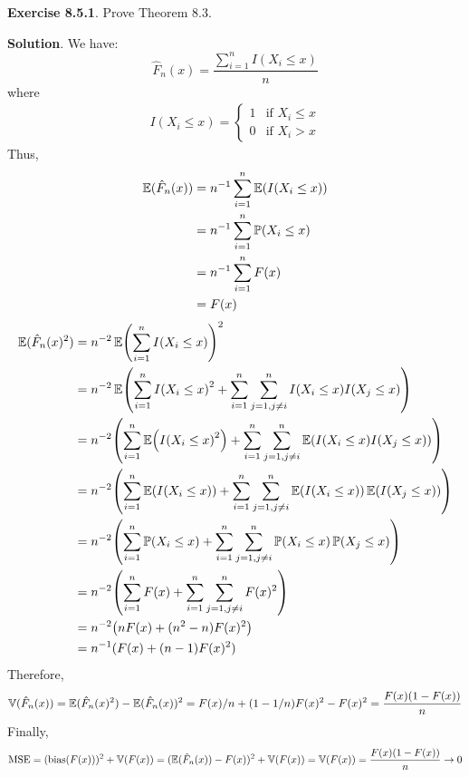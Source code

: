 \textbf{Exercise 8.5.1}. Prove Theorem 8.3.

\textbf{Solution}. We have:
\[
\hat{F}_{n}(x) = \frac{\sum_{i=1}^{n} I\left(X_{i} \leq x \right)}{n}
\]
where
\begin{align*}I\left(X_{i} \leq x\right) =
    \begin{cases}
      1   & \text{if } X_{i} \leq x \\
      0   & \text{if } X_{i} > x
    \end{cases}       
\end{align*}
Thus,
\begin{align*}
\EXP(\hat{F}_{n}(x)) & = n^{-1} \sum_{i = 1}^{n} \EXP(I\left(X_{i} \leq x \right)) \\
 & = n^{-1} \sum_{i = 1}^{n} \PROB\left(X_{i} \leq x \right) \\
 & = n^{-1} \sum_{i = 1}^{n} F(x) \\
 & = F(x)
\end{align*}
\begin{align*}
\EXP(\hat{F}_{n}(x)^{2}) & = n^{-2} \EXP \left( \sum_{i = 1}^{n} I\left(X_{i} \leq x \right) \right)^{2} \\
& = n^{-2} \EXP \left( \sum_{i = 1}^{n} I\left(X_{i} \leq x \right)^{2} 
+ \sum_{i = 1}^{n} \sum_{j = 1, j \neq i}^{n} I\left(X_{i} \leq x \right) I\left(X_{j} \leq x \right) \right) \\
& = n^{-2} \left( \sum_{i = 1}^{n} \EXP \left( I\left(X_{i} \leq x \right)^{2} \right)
+ \sum_{i = 1}^{n} \sum_{j = 1, j \neq i}^{n} \EXP \left( I\left(X_{i} \leq x \right) I\left(X_{j} \leq x \right) \right) \right) \\
& = n^{-2} \left( \sum_{i = 1}^{n} \EXP \left( I\left(X_{i} \leq x \right) \right)
+ \sum_{i = 1}^{n} \sum_{j = 1, j \neq i}^{n} \EXP \left( I\left(X_{i} \leq x \right) \right) \EXP \left( I\left(X_{j} \leq x \right) \right) \right) \\
& = n^{-2} \left( \sum_{i = 1}^{n} \PROB\left(X_{i} \leq x \right) 
+ \sum_{i = 1}^{n} \sum_{j = 1, j \neq i}^{n} \PROB\left(X_{i} \leq x \right) \PROB\left(X_{j} \leq x \right)  \right) \\
&= n^{-2} \left( \sum_{i = 1}^{n} F(x)
+ \sum_{i = 1}^{n} \sum_{j = 1, j \neq i}^{n} F(x)^{2}  \right) \\
&= n^{-2} \left( nF(x) + (n^{2} - n)F(x)^{2} \right) \\
&= n^{-1} ( F(x) + (n - 1) F(x)^{2} )
\end{align*}
Therefore,
\[
\operatorname{\mathbb{V}}(\hat{F}_{n}(x)) 
= \operatorname{\mathbb{E}}(\hat{F}_{n}(x)^{2}) - \operatorname{\mathbb{E}}(\hat{F}_{n}(x))^{2}
= F(x) /n + (1 - 1/n)F(x)^{2} - F(x)^{2}
= \frac{F(x)(1 - F(x))}{n}
\]
Finally,
\[
\operatorname{\mathrm{MSE}} = (\text{bias}(F(x)))^{2} + \operatorname{\mathbb{V}}(F(x)) = (\operatorname{\mathbb{E}}(\hat{F}_{n}(x)) - F(x))^{2} + \operatorname{\mathbb{V}}(F(x)) = \operatorname{\mathbb{V}}(F(x)) = \frac{F(x)(1 - F(x))}{n} \rightarrow 0
\]

